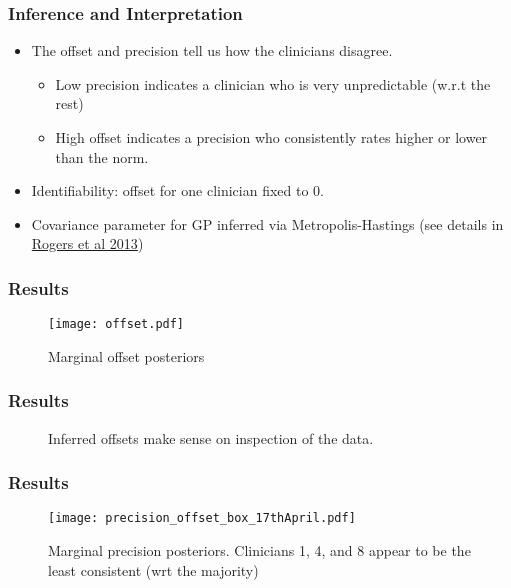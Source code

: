 \begin{frame}
	\frametitle{Inference and Interpretation}
	\begin{itemize}
		\item The offset and precision tell us how the clinicians disagree.
		\begin{itemize}
			\item Low precision indicates a clinician who is very unpredictable (w.r.t the rest)
			\item High offset indicates a precision who consistently rates higher or lower than the norm.
		\end{itemize}
		\item<2->Identifiability: offset for one clinician fixed to 0.
		\item<2->Covariance parameter for GP inferred via Metropolis-Hastings (see details in \href{http://dx.doi.org/10.1109/JBHI.2013.2252182}{Rogers et al 2013})
	\end{itemize}
\end{frame}

\begin{frame}
	\frametitle{Results}
	\begin{figure}[tbh]
		\centering\texttt{[image: offset.pdf]}
		\centering\caption{\label{fig:offset}Marginal offset posteriors}
	\end{figure}
\end{frame}

\begin{frame}
	\frametitle{Results}
	\begin{figure}[tbh]
		\centering\caption{\label{fig:actualratings}Inferred offsets make sense on inspection of the data.}
	\end{figure}
\end{frame}

\begin{frame}
	\frametitle{Results}
	\begin{figure}[tbh]
		\centering\texttt{[image: precision\_offset\_box\_17thApril.pdf]}
		\centering\caption{\label{fig:clinicalprecision}Marginal precision posteriors. Clinicians 1, 4, and 8 appear to be the least consistent (wrt the majority)}
	\end{figure}
\end{frame}

